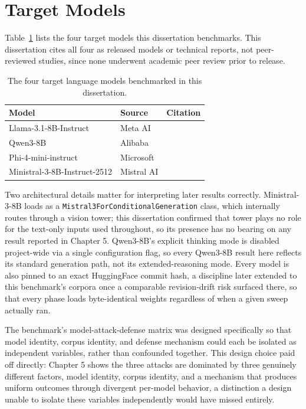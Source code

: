 \section{Target Models}

Table~\ref{tab:target-models} lists the four target models this
dissertation benchmarks. This dissertation cites all four as released
models or technical reports, not peer-reviewed studies, since none
underwent academic peer review prior to release.

\begin{table}[htbp]
\centering
\begin{tabular}{lll}
\hline
\textbf{Model} & \textbf{Source} & \textbf{Citation} \\
\hline
Llama-3.1-8B-Instruct & Meta AI & \citep{grattafiori2024llama3} \\
Qwen3-8B & Alibaba & \citep{yang2025qwen3} \\
Phi-4-mini-instruct & Microsoft & \citep{abouelenin2025phi4mini} \\
Ministral-3-8B-Instruct-2512 & Mistral AI & \citep{mistralai2025ministral3} \\
\hline
\end{tabular}
\caption{The four target language models benchmarked in this dissertation.}
\label{tab:target-models}
\end{table}

Two architectural details matter for interpreting later results
correctly. Ministral-3-8B loads as a
\texttt{Mistral3ForConditionalGeneration} class, which internally routes
through a vision tower; this dissertation confirmed that tower plays no
role for the text-only inputs used throughout, so its presence has no
bearing on any result reported in Chapter 5. Qwen3-8B's explicit
thinking mode is disabled project-wide via a single configuration flag,
so every Qwen3-8B result here reflects its standard generation path, not
its extended-reasoning mode. Every model is also pinned to an exact
HuggingFace commit hash, a discipline later extended to this benchmark's
corpora once a comparable revision-drift risk surfaced there, so that
every phase loads byte-identical weights regardless of when a given
sweep actually ran.

The benchmark's model-attack-defense matrix was designed specifically so
that model identity, corpus identity, and defense mechanism could each
be isolated as independent variables, rather than confounded together.
This design choice paid off directly: Chapter 5 shows the three attacks
are dominated by three genuinely different factors, model identity,
corpus identity, and a mechanism that produces uniform outcomes through
divergent per-model behavior, a distinction a design unable to isolate
these variables independently would have missed entirely.

